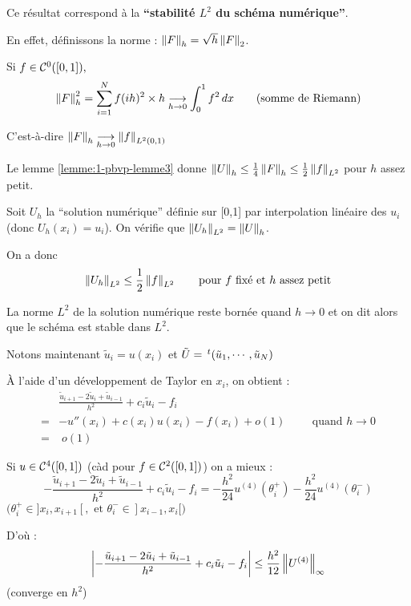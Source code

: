 Ce résultat correspond à la \textbf{``stabilité $L^2$ du schéma numérique''}.

En effet, définissons la norme : $\left\lVert F\right\rVert_h = \sqrt{h} \left\lVert F\right\rVert_2$.

Si $f \in \mathcal{C}^0([0,1]), $ 
\[
    \left\lVert F\right\rVert_h^2 = \sum_{i=1}^N f(ih)^2 \times h \underset{h\to0}{\longrightarrow} \int_0^1 f^2 \,dx \hspace{0.7cm} \text{(somme de Riemann)}
\]

C'est-à-dire $\left\lVert F\right\rVert_h \underset{h\to 0}{\longrightarrow} \left\lVert f\right\rVert_{L^2(0,1)}$

Le lemme \ref{lemme:1-pbvp-lemme3} donne $\left\lVert U\right\rVert_h \leq \frac{1}{4}\left\lVert F\right\rVert_h \leq \frac{1}{2} \left\lVert f\right\rVert_{L^2}$ pour $h$ assez petit.

Soit $U_h$ la ``solution numérique'' définie sur [0,1] par interpolation
linéaire des $u_i$ (donc $U_h(x_i) = u_i$). On vérifie que $\left\lVert U_h\right\rVert_{L^2} = \left\lVert U\right\rVert_h$.

On a donc 
\[
    \left\lVert U_h\right\rVert_{L^2} \leq \frac{1}{2} \left\lVert f\right\rVert_{L^2} \hspace{0.7cm} \text{pour $f$ fixé et $h$ assez petit}
\]

La norme $L^2$ de la solution numérique reste bornée quand $h \longrightarrow 0$
et on dit alors que le schéma est stable dans $L^2$.

Notons maintenant $\tilde u_i = u(x_i)$ et $\tilde U = \,^t(\tilde u_1, \cdots , \tilde u_N )$

À l'aide d'un développement de Taylor en $x_i$, on obtient :
\begin{align*}
    & \frac{\tilde u_{i+1} - 2 \tilde u_i + \tilde u_{i-1}}{h^2} + c_i \tilde u_i - f_i \\
    = & - u''(x_i) + c(x_i) u(x_i) - f(x_i) + o(1) \hspace{1cm} \text{quand } h\to0 \\
    = & \;o(1)
\end{align*}

Si $u \in \mathcal{C}^4([0,1])$ (càd pour $f \in \mathcal{C}^2([0,1])$) on a mieux :
\[
    - \frac{\tilde u_{i+1} - 2 \tilde u_i + \tilde u_{i-1}}{h^2} + c_i \tilde u_i - f_i = - \frac{h^2}{24} u^{(4)} (\theta_i^+) - \frac{h^2}{24} u^{(4)}(\theta_i^-)
\] 
    \hfill $\Big(\theta_i^+ \in ]x_i,x_{i+1}[, \text{ et } \theta_i^- \in ]x_{i-1},x_i[ \Big)$

    D'où :
    \[
        \left| - \frac{\tilde u_{i+1} - 2 \tilde u_i + \tilde u_{i-1}}{h^2}
        + c_i \tilde u_i - f_i \right| \leq \frac{h^2}{12} \left\lVert U^{(4)}\right\rVert_\infty
    \]
    \hfill (converge en $h^2$)

